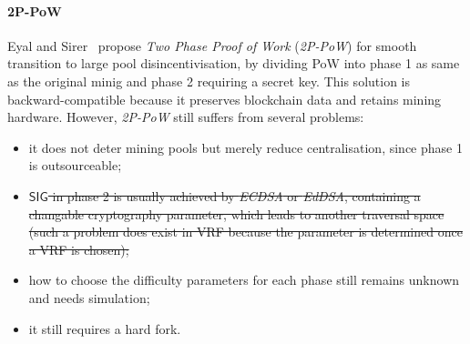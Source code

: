 \paragraph{\textbf{2P-PoW}}
Eyal and Sirer~\cite{2P-PoW} propose \textit{Two Phase Proof of Work} (\textit{2P-PoW}) for smooth transition to large pool disincentivisation, by dividing PoW into phase 1 as same as the original minig and phase 2 requiring a secret key.
This solution is backward-compatible because it preserves blockchain data and retains mining hardware. 
However, \textit{2P-PoW} still suffers from several problems:
\begin{itemize}
\renewcommand\labelitemi{$\bullet$}
    \item it does not deter mining pools but merely reduce centralisation, since phase 1 is outsourceable;
    \item \sout{$\mathsf{SIG}$ in phase 2 is usually achieved by \textit{ECDSA} or \textit{EdDSA}, containing a changable cryptography parameter, which leads to another traversal space (such a problem does exist in VRF because the parameter is determined once a VRF is chosen);} 
    \item how to choose the difficulty parameters for each phase still remains unknown and needs simulation;
    \item it still requires a hard fork.
\end{itemize}
